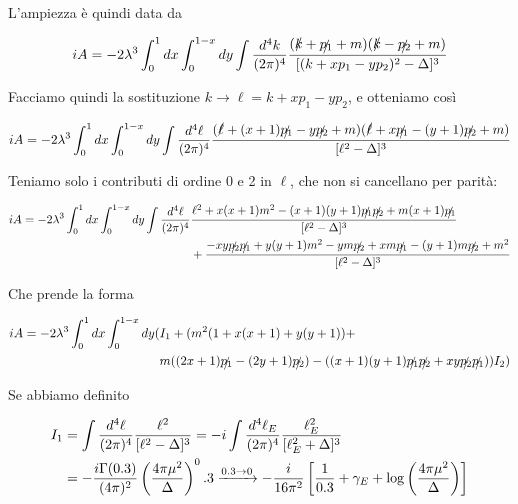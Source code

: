 \documentclass[11pt]{report}
\begin{document}
L'ampiezza è quindi data da 

\begin{align}
    iA = -2\lambda^3 \int_0^1 dx\int_0^{1-x} dy\int \frac{d^4k}{(2\pi)^4}\frac{(\slashed{k}+ \slashed{p_1} +m)(\slashed{k}- \slashed{p_2} +m)}{[(k+xp_1 - yp_2)^2 - \Delta]^3}
\end{align}

Facciamo quindi la sostituzione \(k \to \ell = k+xp_1 - yp_2\), e otteniamo così 

\begin{align}
    iA = -2\lambda^3 \int_0^1dx \int_0^{1-x} dy \int \frac{d^4\ell}{(2\pi)^4}\frac{(\slashed{\ell} + (x+1)\slashed{p_1} - y\slashed{p_2} + m)(\slashed{\ell} + x\slashed{p_1} - (y+1)\slashed{p_2} + m)}{[\ell^2 - \Delta]^3}
\end{align}

Teniamo solo i contributi di ordine 0 e 2 in \(\ell\), che non si cancellano per parità: 

\begin{align}
    iA = -2\lambda^3\int_0^1 dx \int_0^{1-x} dy \int \frac{d^4\ell}{(2\pi)^4} &\frac{\ell^2 + x(x+1)m^2 -(x+1)(y+1)\slashed{p_1}\slashed{p_2} + m(x+1)\slashed{p_1}}{[\ell^2 - \Delta]^3} \notag \\ 
    &+ \frac{-xy\slashed{p_2}\slashed{p_1} +y(y+1)m^2 -ym\slashed{p_2} + xm\slashed{p_1} - (y+1)m\slashed{p_2} +m^2}{[\ell^2 -\Delta]^3}
\end{align}

Che prende la forma 

\begin{align}
    iA = -2\lambda^3 \int_0^1 dx \int_0^{1-x} dy (&I_1 + (m^2(1 + x(x+1) + y(y+1)) + \notag \\ 
    &m((2x+1)\slashed{p_1} - (2y+1)\slashed{p_2}) -((x+1)(y+1)\slashed{p_1}\slashed{p_2} + xy\slashed{p_2}\slashed{p_1}))I_2)
\end{align}

Se abbiamo definito

\begin{align}
    I_1 &= \int \frac{d^4\ell}{(2\pi)^4}\frac{\ell^2}{[\ell^2 -\Delta]^3} = -i\int \frac{d^4\ell_E}{(2\pi)^4}\frac{\ell_E^2}{[\ell_E^2+\Delta]^3} \notag \\ &= -\frac{i\Gamma(0.3)}{(4\pi)^2}\left(\frac{4\pi\mu^2}{\Delta} \right)^0.3 \xrightarrow{0.3 \to 0} -\frac{i}{16\pi^2}\left[\frac{1}{0.3} + \gamma_E + \log\left(\frac{4\pi\mu^2}{\Delta}\right) \right]
\end{align}
\end{document}
